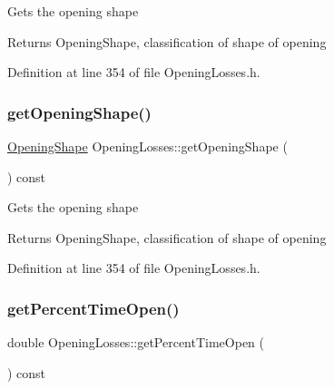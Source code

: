 Gets the opening shape

\begin{DoxyReturn}{Returns}
Opening\+Shape, classification of shape of opening 
\end{DoxyReturn}


Definition at line 354 of file Opening\+Losses.\+h.

\mbox{\label{class_opening_losses_a5046cd699178e4edca774d0d0da7965a}} 
\subsubsection{\texorpdfstring{get\+Opening\+Shape()}{getOpeningShape()}\hspace{0.1cm}{\footnotesize\ttfamily [3/3]}}
{\footnotesize\ttfamily \hyperlink{class_opening_losses_a57f9759b6fd72a1b75aa885800e26157}{Opening\+Shape} Opening\+Losses\+::get\+Opening\+Shape (\begin{DoxyParamCaption}{ }\end{DoxyParamCaption}) const\hspace{0.3cm}{\ttfamily [inline]}}

Gets the opening shape

\begin{DoxyReturn}{Returns}
Opening\+Shape, classification of shape of opening 
\end{DoxyReturn}


Definition at line 354 of file Opening\+Losses.\+h.

\mbox{\label{class_opening_losses_aeefc3790a569008ff2e804033a9efea3}} 
\subsubsection{\texorpdfstring{get\+Percent\+Time\+Open()}{getPercentTimeOpen()}\hspace{0.1cm}{\footnotesize\ttfamily [1/3]}}
{\footnotesize\ttfamily double Opening\+Losses\+::get\+Percent\+Time\+Open (\begin{DoxyParamCaption}{ }\end{DoxyParamCaption}) const\hspace{0.3cm}{\ttfamily [inline]}}


